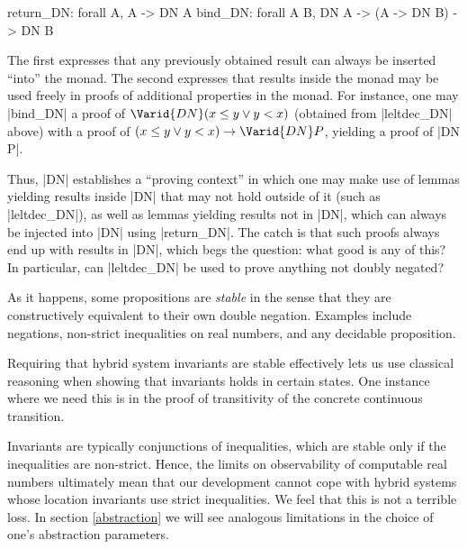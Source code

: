\documentclass[runningheads]{llncs}
\newcommand{\weg}[1]{}
\newcommand{\DN}{{\sf DN}\,}
\newcommand{\Inv}{{\rm Inv}}
\newcommand{\leltdecDN}{{\tt leltdecDN}}
\begin{document}
\begin{code}
  return_DN: forall A, A -> DN A
  bind_DN: forall A B, DN A -> (A -> DN B) -> DN B
\end{code}

The first expresses that any previously obtained result can always be
inserted ``into'' the monad. The second expresses that results inside
the monad may be used freely in proofs of additional properties in the
monad. For instance, one may |bind_DN| a proof of $\Varid{DN} (x \leq y \vee y < x)$
(obtained from |leltdec_DN| above) with a proof of $(x \leq y \vee y < x) \rightarrow \Varid{DN} P$, yielding a proof of |DN P|.
 
Thus, |DN| establishes a ``proving context'' in which one may make
use of lemmas yielding results inside |DN| that may not hold outside
of it (such as |leltdec_DN|), as well as lemmas yielding results
not in |DN|, which can always be injected into |DN| using
|return_DN|. The catch is that such proofs always end up with results
in |DN|, which begs the question: what good is any of this? In
particular, can |leltdec_DN| be used to prove anything not doubly
negated?
 
As it happens, some propositions are \emph{stable} in the sense that they are constructively equivalent to their own double negation. Examples include
negations, non-strict inequalities on real numbers, and any decidable
proposition.

Requiring that hybrid system invariants are stable effectively lets us use classical reasoning when showing that invariants holds in certain states. One instance where we need this is in the proof of transitivity of the concrete continuous transition.

\weg{ %
We have seen why we required invariant stability:
in the transitivity proof for continuous transitions
it allows
us to employ $\leltdecDN$ to do case distinction on the $t$ variable
when showing that the invariant holds at each point along the
composite path. That is, we simply bind $\leltdecDN t d$ of type
$\DN (t \leq d \vee d < t)$ with the straightforward proof of $(t \leq d
\vee d < t) \rightarrow \DN (\Inv_l(\Phi_l (p, t)))$, and
then pull the latter out of $\DN$ on account of its stability.
}

Invariants are typically conjunctions of inequalities, which are
stable only if the inequalities are non-strict. Hence, the limits on
observability of computable real numbers ultimately mean that our
development cannot cope with hybrid systems whose location invariants
use strict inequalities. We feel that this is not a terrible loss. In
section \ref{abstraction} we will see analogous limitations in the
choice of one's abstraction parameters.
 
\end{document}
